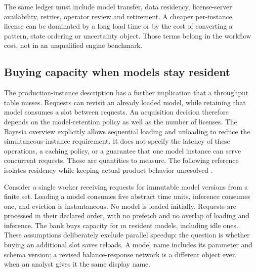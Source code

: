 The same ledger must include model transfer, data residency, license-server
availability, retries, operator review and retirement. A cheaper per-instance
license can be dominated by a long load time or by the cost of converting a
pattern, state ordering or uncertainty object. Those terms belong in the
workflow cost, not in an unqualified engine benchmark.



\subsection{Buying capacity when models stay resident}
\label{exec17:s8-residency}

The production-instance description has a further implication that a throughput
table misses. Requests can revisit an already loaded model, while retaining
that model consumes a slot between requests. An acquisition decision therefore
depends on the model-retention policy as well as the number of licenses. The
Bayesia overview explicitly allows sequential loading and unloading to reduce
the simultaneous-instance requirement. It does not specify the latency of
these operations, a caching policy, or a guarantee that one model instance can
serve concurrent requests. Those are quantities to measure. The following
reference isolates residency while keeping actual product behavior unresolved
\citep{exec13_bayesia_api,exec17_s8_residency}.

Consider a single worker receiving requests for immutable model versions from
a finite set. Loading a model consumes five abstract time units, inference
consumes one, and eviction is instantaneous. No model is loaded initially.
Requests are processed in their declared order, with no prefetch and no overlap
of loading and inference. The bank buys capacity for $m$ resident models,
including idle ones. These assumptions deliberately exclude parallel speedup:
the question is whether buying an additional slot saves reloads. A model name
includes its parameter and schema version; a revised balance-response network
is a different object even when an analyst gives it the same display name.

